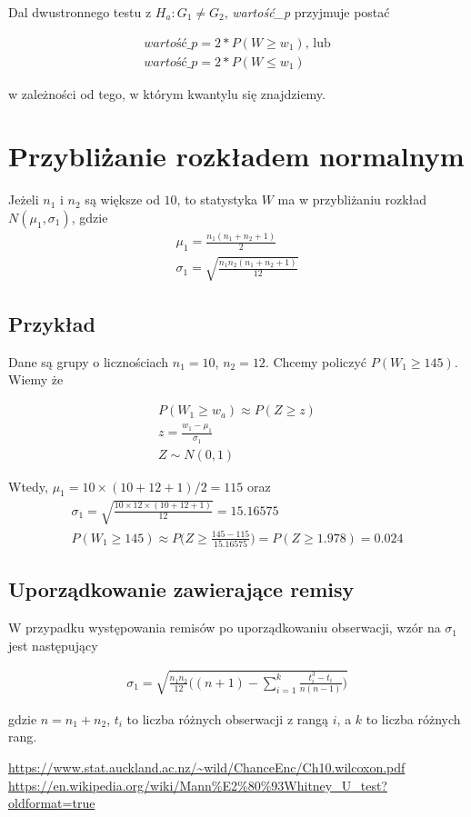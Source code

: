 \documentclass[a4paper]{article}
\begin{document}
Dal dwustronnego testu z $H_a : G_1 \neq G_2$, \textit{wartość\_p} przyjmuje postać

\begin{align}
     \textit{wartość\_p} = 2 * P(W \geq w_1) 
     \text{, lub}\\
     \textit{wartość\_p} = 2 * P(W \leq w_1)
\end{align}

w zależności od tego, w którym kwantylu się znajdziemy.

\section{Przybliżanie rozkładem normalnym}

Jeżeli $n_1$ i $n_2$ są większe od $10$, to statystyka $W$ ma w przybliżaniu rozkład $N(\mu_1, \sigma_1)$, gdzie
\begin{align}
    \mu_1 = \frac{n_1 (n_1 + n_2 + 1)}{2} \\
    \sigma_1 = \sqrt{\frac{n_1 n_2(n_1+n_2+1)}{12}}
\end{align}

\subsection{Przykład}

Dane są grupy o licznościach $n_1 = 10$, $n_2 = 12$. Chcemy policzyć $P(W_1 \geq 145)$. Wiemy że

\begin{align}
    P(W_1 \geq w_a) \approx P(Z \geq z) \\ 
    z = \frac{w_1 - \mu_1}{\sigma_1} \\
    Z \sim N(0, 1)
\end{align}

Wtedy, $\mu_1 = 10 \times (10 + 12 + 1)/ 2 = 115$ oraz 
\begin{align}
    \sigma_1 = \sqrt{\frac{10 \times 12 \times (10 + 12 + 1)}{12}} = 15.16575 \\
    P(W_1 \geq 145) \approx P \Big(Z \geq \frac{145-115}{15.16575}\Big) = P(Z \geq 1.978) = 0.024
\end{align}

\subsection{Uporządkowanie zawierające remisy}

W przypadku występowania remisów po uporządkowaniu obserwacji, wzór na $\sigma_1$ jest następujący

\begin{align}
    \sigma_1 = \sqrt{\frac{n_1 n_2}{12} \bigg( (n+1) - \sum_{i=1}^{k}{\frac{t_i^{3} -t_i}{n(n-1)}} \bigg)}
\end{align}

gdzie $n = n_1 + n_2$, $t_i$ to liczba różnych obserwacji z rangą $i$, a $k$ to liczba różnych rang.

\begin{thebibliography}{9}
 \url{https://www.stat.auckland.ac.nz/~wild/ChanceEnc/Ch10.wilcoxon.pdf}
 \url{https://en.wikipedia.org/wiki/Mann%E2%80%93Whitney_U_test?oldformat=true}
\end{thebibliography}
\end{document}
